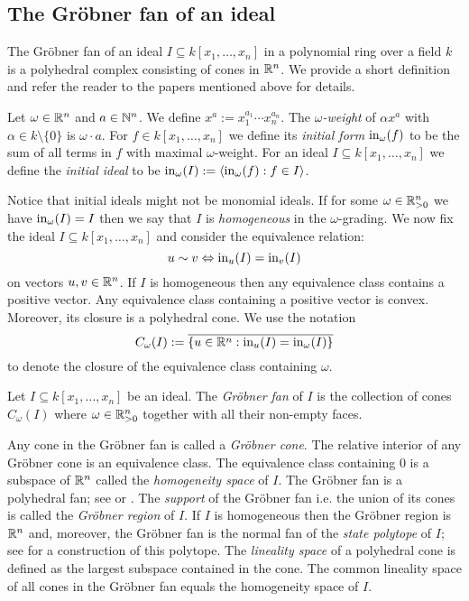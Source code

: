 \subsection{The Gr\"obner fan of an ideal}
The Gr\"obner fan of an ideal $I\subseteq k[x_1,\dots,x_n]$ in a polynomial ring over a field $k$ is a
polyhedral complex consisting of cones in $\mathbb{R}^n$. 
We provide a short definition and refer the reader to the papers mentioned above for details.
\begin{definition}
Let $\omega\in\mathbb{R}^n$ and $a\in\mathbb{N}^n$. We define $x^a:=x_1^{a_1}\cdots
x_n^{a_n}$. The \emph{$\omega$-weight} of $\alpha x^a$ with
$\alpha\in k\setminus\{0\}$ is $\omega\cdot a$. For $f\in
k[x_1,\dots,x_n]$ we define its \emph{initial form} $\textup{in}_\omega(f)$ to be
the sum of all terms in $f$ with maximal $\omega$-weight. For an ideal
$I\subseteq k[x_1,\dots,x_n]$ we define the \emph{initial ideal} to be
$\textup{in}_\omega(I):=\langle \textup{in}_\omega(f):f\in I\rangle$.
\end{definition}
Notice that initial ideals might not be monomial ideals. If for some
$\omega\in\mathbb{R}_{>0}^n$ we have $\textup{in}_\omega(I)=I$ then we say that $I$
is \emph{homogeneous} in the $\omega$-grading. We now fix the
ideal $I\subseteq k[x_1,\dots,x_n]$ and consider the equivalence
relation:
$$u\sim v \Leftrightarrow \textup{in}_u(I)=\textup{in}_v(I)$$ on vectors $u,v\in
\mathbb{R}^n$. If $I$ is homogeneous then any equivalence class contains a
positive vector. Any equivalence class containing a positive vector is
convex. Moreover, its closure is a polyhedral cone. We use the notation
$$C_\omega(I):=\overline{\{u\in\mathbb{R}^n:\textup{in}_u(I)=\textup{in}_\omega(I)\}}$$
to denote the closure of the equivalence class containing $\omega$.

\begin{definition}\cite[Definition~2.8]{fukuda}
\label{def:gfan}
Let $I\subseteq k[x_1,\dots,x_n]$ be an ideal. The \emph{Gr\"obner fan} of
$I$ is the collection of cones $C_\omega(I)$ where
$\omega\in\mathbb{R}_{>0}^n$ together with all their non-empty faces.
\end{definition}

Any cone in the Gr\"obner fan is called a \emph{Gr\"obner cone}. The
relative interior of any Gr\"obner cone is an equivalence class. The
equivalence class containing $0$ is a subspace of $\mathbb{R}^n$ called
the \emph{homogeneity space} of $I$.  The Gr\"obner fan is a
polyhedral fan; see \cite{sturmfels} or
\cite{fukuda}.  The \emph{support} of the Gr\"obner fan i.e. the union
of its cones is called the \emph{Gr\"obner region} of $I$. If $I$ is
homogeneous then the Gr\"obner region is $\mathbb{R}^n$ and, moreover, the
Gr\"obner fan is the normal fan of the \emph{state polytope} of $I$; see
\cite{sturmfels} for a construction of this polytope.
The \emph{lineality space} of a polyhedral cone is defined as the
largest subspace contained in the cone. The common lineality space of
all cones in the Gr\"obner fan equals the homogeneity space of $I$.

